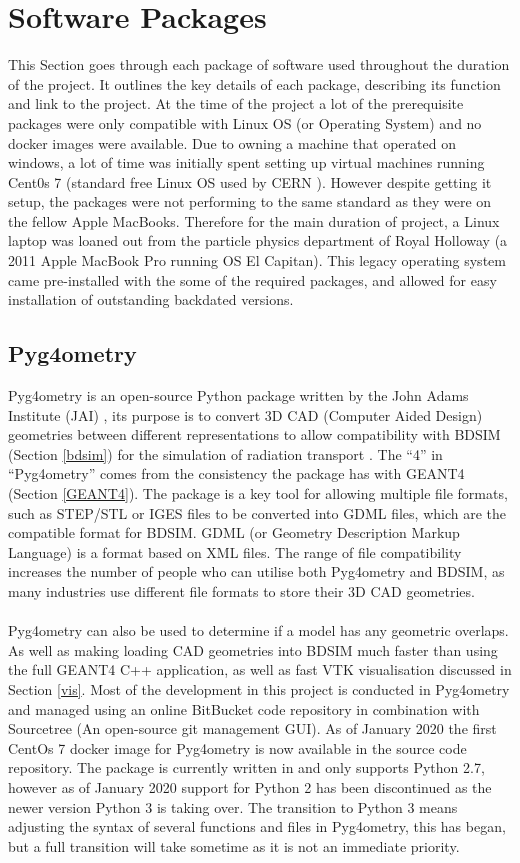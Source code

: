 \documentclass[12pt,a4paper]{article}
\begin{document}
\section{Software Packages}
\label{packs}
This Section goes through each package of software used throughout the duration of the project. It outlines the key details of each package, describing its function and link to the project. At the time of the project a lot of the prerequisite packages were only compatible with Linux OS  (or Operating System) and no docker images were available. Due to owning a machine that operated on windows, a lot of time was initially spent setting up virtual machines running Cent0s 7 (standard free Linux OS used by CERN \cite{cern}). However despite getting it setup, the packages were not performing to the same standard as they were on the fellow Apple MacBooks. Therefore for the main duration of project, a Linux laptop was loaned out from the particle physics department of Royal Holloway (a 2011 Apple MacBook Pro running OS El Capitan). This legacy operating system came pre-installed with the some of the required packages, and allowed for easy installation of outstanding backdated versions. 

\subsection{Pyg4ometry}
\label{pyg}
Pyg4ometry is an open-source Python package  written by the John Adams Institute (JAI) \cite{jai}, its purpose is to convert 3D CAD (Computer Aided Design) geometries between different representations to allow compatibility with BDSIM (Section \ref{bdsim}) for the simulation of radiation transport \cite{pyg4om}. The ``4'' in ``Pyg4ometry'' comes from the consistency the package has with GEANT4 (Section \ref{GEANT4}). The package is a key tool for allowing multiple file formats, such as STEP/STL or IGES files to be converted into GDML files, which are the compatible format for BDSIM. GDML (or Geometry Description Markup Language) is a format based on XML files. The range of file compatibility increases the number of people who can utilise both Pyg4ometry and BDSIM, as many industries use different file formats to store their 3D CAD geometries.
\\\\
\noindent Pyg4ometry can also be used to determine if a model has any geometric overlaps. As well as making loading CAD geometries into BDSIM much faster than using the full GEANT4 C++ application, as well as fast VTK visualisation discussed in Section \ref{vis}. Most of the development in this project is conducted in Pyg4ometry and managed using an online BitBucket code repository \cite{bitb} in combination with Sourcetree \cite{st} (An open-source git management GUI). As of January 2020 the first CentOs 7 docker image for Pyg4ometry is now available in the source code repository. The package is currently written in and only supports Python 2.7, however as of January 2020 support for Python 2 has been discontinued as the newer version Python 3 is taking over. The transition to Python 3 means adjusting the syntax of several functions and files in Pyg4ometry, this has began, but a full transition will take sometime as it is not an immediate priority. 
\end{document}

